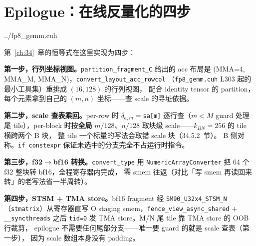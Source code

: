 \section{Epilogue：在线反量化的四步}\label{sec:35-epilogue}

\begin{lstinputlisting}[linerange={545-586},firstnumber=auto,
  title={fp8\_gemm.cuh L545-586（epilogue：scale 查表 $\to$ bf16 转换 $\to$ STSM $\to$ TMA store）}]{../fp8_gemm.cuh}
\end{lstinputlisting}

第~\ref{ch:34}~章的恒等式在这里实现为四步：

\textbf{第一步，行列坐标视图。}\texttt{partition\_fragment\_C} 给出的 acc
布局是 (MMA=4, MMA\_M, MMA\_N)，\texttt{convert\_layout\_acc\_rowcol}
（\texttt{fp8\_gemm.cuh} L303 起的最小工具集）重排成 $(16,128)$ 的行列视图，
配合 identity tensor 的 partition，每个元素拿到自己的 $(m,n)$ 坐标——查
scale 的寻址依据。

\textbf{第二步，scale 查表乘回。}per-row 时 $\delta_{a,m} = $\texttt{sa[m]}
逐行查（$m<M$ guard 处理尾 tile），per-block 时按\textbf{全局}
$m/128$、$n/128$ 取块级 scale——$k_{BN}{=}256$ 的 tile 横跨两个 B 块，
整 tile 一个标量的写法会取错 scale 块（34.5.2~节）。
B 侧对称。\texttt{if constexpr} 保证未选中的分支完全不占运行时指令。

\textbf{第三步，f32$\to$bf16 转换。}\texttt{convert\_type} 用
\texttt{NumericArrayConverter} 把 64 个 f32 整块转 bf16，全程寄存器内完成，
零 smem 往返（对比「写 smem 再读回来转」的老写法省一半周转）。

\textbf{第四步，STSM + TMA store。}bf16 fragment 经
\texttt{SM90\_U32x4\_STSM\_N}（\texttt{stmatrix}）从寄存器直写 O staging
smem，\texttt{fence\_view\_async\_shared} + \texttt{\_\_syncthreads} 之后
\texttt{tid=0} 发 TMA store。M/N 尾 tile 靠 TMA store 的 OOB 行裁剪，
epilogue 不需要任何尾部分支——唯一要 guard 的就是 scale 查表（第一步），
因为 scale 数组本身没有 padding。


